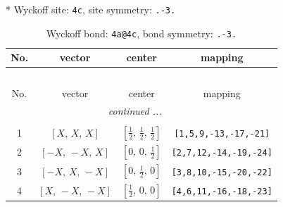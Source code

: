 \documentclass[fleqn,8pt]{jsarticle}
\begin{document}
* Wyckoff site: {\tt 4c}, site symmetry: {\tt .-3.}
\renewcommand{\arraystretch}{1.2}
\begin{longtable}{cccc}
\caption{Wyckoff bond: {\tt 4a@4c}, bond symmetry: {\tt .-3.}}
 \\
 \hline \hline
No. & vector & center & mapping \\ \hline \endfirsthead

\multicolumn{3}{l}{\tablename\ \thetable{}} \\
 \hline \hline
No. & vector & center & mapping \\ \hline \endhead

 \hline \hline
\multicolumn{3}{r}{\footnotesize\it continued ...} \\ \endfoot

 \hline \hline
\multicolumn{3}{r}{} \\ \endlastfoot

1 & $\left[ X,\, X,\, X \right]$ & $\left[ \frac{1}{2},\, \frac{1}{2},\, \frac{1}{2} \right]$ & {\tt [1,5,9,-13,-17,-21]} \\ \hline
2 & $\left[ - X,\, - X,\, X \right]$ & $\left[ 0,\, 0,\, \frac{1}{2} \right]$ & {\tt [2,7,12,-14,-19,-24]} \\ \hline
3 & $\left[ - X,\, X,\, - X \right]$ & $\left[ 0,\, \frac{1}{2},\, 0 \right]$ & {\tt [3,8,10,-15,-20,-22]} \\ \hline
4 & $\left[ X,\, - X,\, - X \right]$ & $\left[ \frac{1}{2},\, 0,\, 0 \right]$ & {\tt [4,6,11,-16,-18,-23]} \\
\end{longtable}
\renewcommand{\arraystretch}{1.2}
\end{document}

